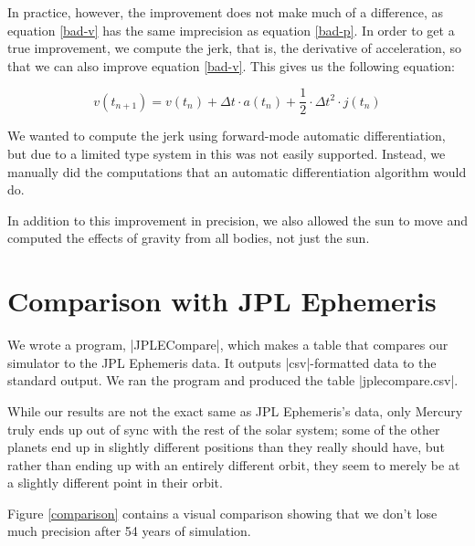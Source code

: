 \documentclass[a4paper]{article}
\begin{document}
In practice, however, the improvement does not make much of a difference, as equation \ref{bad-v} has the same imprecision as equation \ref{bad-p}. In order to get a true improvement, we compute the jerk, that is, the derivative of acceleration, so that we can also improve equation \ref{bad-v}. This gives us the following equation:

\begin{equation} \label{good-v}
v(t_{n+1}) = v(t_n) + \Delta t \cdot a(t_n) + \frac{1}{2} \cdot \Delta t^2 \cdot j(t_n)
\end{equation}

We wanted to compute the jerk using forward-mode automatic differentiation, but due to a limited type system in \Fsh this was not easily supported. Instead, we manually did the computations that an automatic differentiation algorithm would do.

In addition to this improvement in precision, we also allowed the sun to move and computed the effects of gravity from all bodies, not just the sun.

\section{Comparison with JPL Ephemeris}

We wrote a program, \code|JPLECompare|, which makes a table that compares our simulator to the JPL Ephemeris data. It outputs \code|csv|-formatted data to the standard output. We ran the program and produced the table \code|jplecompare.csv|.

While our results are not the exact same as JPL Ephemeris's data, only Mercury truly ends up out of sync with the rest of the solar system; some of the other planets end up in slightly different positions than they really should have, but rather than ending up with an entirely different orbit, they seem to merely be at a slightly different point in their orbit.

Figure \ref{comparison} contains a visual comparison showing that we don't lose much precision after 54 years of simulation.
\end{document}
